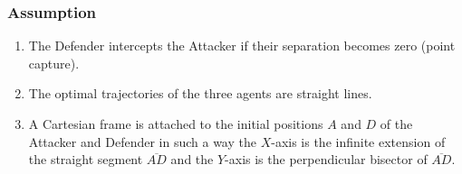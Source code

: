 \documentclass{beamer}
\begin{document}
\begin{frame}
\frametitle{Assumption}
\begin{enumerate}
	\item The Defender intercepts the Attacker if their separation becomes zero (point capture).
	\item The optimal trajectories of the three agents are straight lines.
	\item A Cartesian frame is attached to the initial positions $A$ and $D$ of the Attacker and Defender in such a way the $X$-axis is the infinite extension of the straight segment $\overline{AD}$ and the $Y$-axis is the perpendicular bisector of $\overline{AD}$.
\end{enumerate}
\end{frame}
\subsection{}
\end{document}
